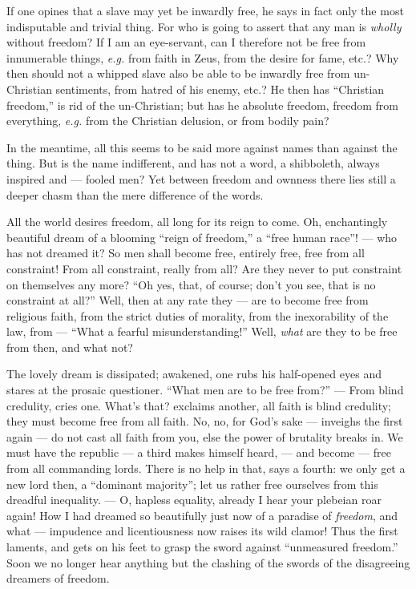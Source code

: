 If one opines that a slave may yet be inwardly free, he says in fact only the 
most indisputable and trivial thing. For who is going to assert that any man 
is \textit{wholly} without freedom? If I am an eye-servant, can I therefore 
not be free from innumerable things, \textit{e.g.} from faith in Zeus, from 
the desire for fame, etc.? Why then should not a whipped slave also be able to 
be inwardly free from un-Christian sentiments, from hatred of his enemy, etc.? 
He then has ``Christian freedom,'' is rid of the un-Christian; but has he 
absolute freedom, freedom from everything, \textit{e.g.} from the Christian 
delusion, or from bodily pain?

In the meantime, all this seems to be said more against names than against the 
thing. But is the name indifferent, and has not a word, a shibboleth, always 
inspired and --- fooled men? Yet between freedom and ownness there lies still a 
deeper chasm than the mere difference of the words.

All the world desires freedom, all long for its reign to come. Oh, 
enchantingly beautiful dream of a blooming ``reign of freedom,'' a ``free 
human race''! --- who has not dreamed it? So men shall become free, entirely 
free, free from all constraint! From all constraint, really from all? Are they 
never to put constraint on themselves any more? ``Oh yes, that, of course; 
don't you see, that is no constraint at all?'' Well, then at any rate they --- 
are to become free from religious faith, from the strict duties of morality, 
from the inexorability of the law, from --- ``What a fearful 
misunderstanding!'' Well, \textit{what} are they to be free from then, and 
what not?

The lovely dream is dissipated; awakened, one rubs his half-opened eyes and 
stares at the prosaic questioner. ``What men are to be free from?'' --- From 
blind credulity, cries one. What's that? exclaims another, all faith is blind 
credulity; they must become free from all faith. No, no, for God's sake --- 
inveighs the first again --- do not cast all faith from you, else the power of 
brutality breaks in. We must have the republic --- a third makes himself heard, --- and become --- free from all commanding lords. There is no help in that, 
says a fourth: we only get a new lord then, a ``dominant majority''; let us 
rather free ourselves from this dreadful inequality. --- O, hapless equality, 
already I hear your plebeian roar again! How I had dreamed so beautifully just 
now of a paradise of \textit{freedom}, and what --- impudence and 
licentiousness now raises its wild clamor! Thus the first laments, and gets on 
his feet to grasp the sword against ``unmeasured freedom.'' Soon we no 
longer hear anything but the clashing of the swords of the disagreeing 
dreamers of freedom.

